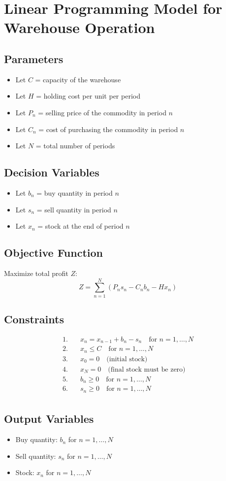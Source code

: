 \documentclass{article}
\begin{document}
\section*{Linear Programming Model for Warehouse Operation}

\subsection*{Parameters}
\begin{itemize}
    \item Let \( C \) = capacity of the warehouse
    \item Let \( H \) = holding cost per unit per period
    \item Let \( P_n \) = selling price of the commodity in period \( n \)
    \item Let \( C_n \) = cost of purchasing the commodity in period \( n \)
    \item Let \( N \) = total number of periods
\end{itemize}

\subsection*{Decision Variables}
\begin{itemize}
    \item Let \( b_n \) = buy quantity in period \( n \)
    \item Let \( s_n \) = sell quantity in period \( n \)
    \item Let \( x_n \) = stock at the end of period \( n \)
\end{itemize}

\subsection*{Objective Function}
Maximize total profit \( Z \):
\[
Z = \sum_{n=1}^{N} \left( P_n s_n - C_n b_n - H x_n \right)
\]

\subsection*{Constraints}
\begin{align*}
1. & \quad x_n = x_{n-1} + b_n - s_n \quad \text{for } n = 1, \ldots, N \\
2. & \quad x_n \leq C \quad \text{for } n = 1, \ldots, N \\
3. & \quad x_0 = 0 \quad \text{(initial stock)} \\
4. & \quad x_N = 0 \quad \text{(final stock must be zero)} \\
5. & \quad b_n \geq 0 \quad \text{for } n = 1, \ldots, N \\
6. & \quad s_n \geq 0 \quad \text{for } n = 1, \ldots, N \\
\end{align*}

\subsection*{Output Variables}
\begin{itemize}
    \item Buy quantity: \( b_n \) for \( n = 1, \ldots, N \)
    \item Sell quantity: \( s_n \) for \( n = 1, \ldots, N \)
    \item Stock: \( x_n \) for \( n = 1, \ldots, N \)
\end{itemize}
\end{document}
